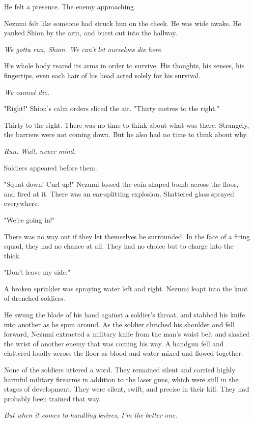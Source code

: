He felt a presence. The enemy approaching.

Nezumi felt like someone had struck him on the cheek. He was wide awake.
He yanked Shion by the arm, and burst out into the hallway.

\emph{We gotta run, Shion. We can't let ourselves die here.}

His whole body reared its arms in order to survive. His thoughts, his
senses, his fingertips, even each hair of his head acted solely for his
survival.

\emph{We cannot die.}

"Right!" Shion's calm orders sliced the air. "Thirty metres to the
right."

Thirty to the right. There was no time to think about what was there.
Strangely, the barriers were not coming down. But he also had no time to
think about why.

\emph{Run. Wait, never mind.}

Soldiers appeared before them.

"Squat down! Curl up!" Nezumi tossed the coin-shaped bomb across the
floor, and fired at it. There was an ear-splitting explosion. Shattered
glass sprayed everywhere.

"We're going in!"

There was no way out if they let themselves be surrounded. In the face
of a firing squad, they had no chance at all. They had no choice but to
charge into the thick.

"Don't leave my side."

A broken sprinkler was spraying water left and right. Nezumi leapt into
the knot of drenched soldiers.

He swung the blade of his hand against a soldier's throat, and stabbed
his knife into another as he spun around. As the soldier clutched his
shoulder and fell forward, Nezumi extracted a military knife from the
man's waist belt and slashed the wrist of another enemy that was coming
his way. A handgun fell and clattered loudly across the floor as blood
and water mixed and flowed together.

None of the soldiers uttered a word. They remained silent and carried
highly harmful military firearms in addition to the laser guns, which
were still in the stages of development. They were silent, swift, and
precise in their kill. They had probably been trained that way.

\emph{But when it comes to handling knives, I'm the better one.}

